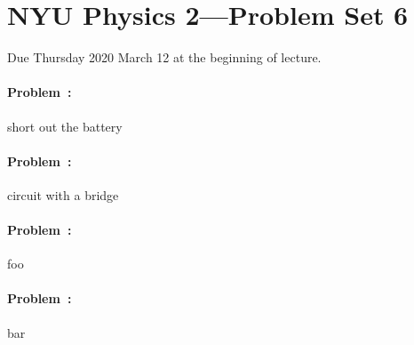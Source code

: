 \documentclass[12pt]{article}
\begin{document}
\section*{NYU Physics 2---Problem Set 6}

Due Thursday 2020 March 12 at the beginning of lecture.

\paragraph{Problem~\theproblem:}%
short out the battery

\paragraph{Problem~\theproblem:}%
circuit with a bridge

\paragraph{Problem~\theproblem:}%
foo

\paragraph{Problem~\theproblem:}%
bar
\end{document}
